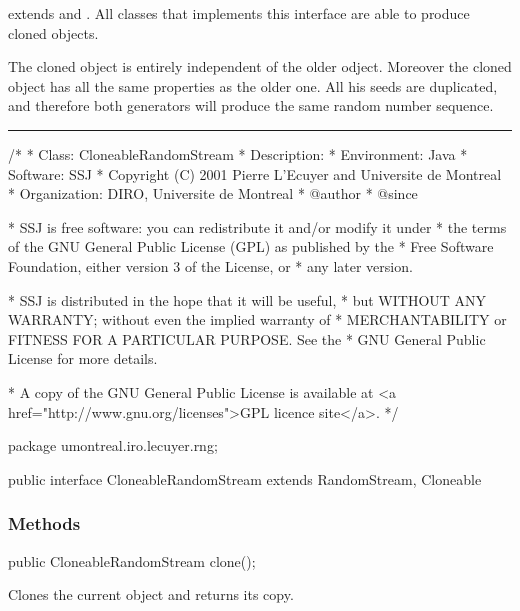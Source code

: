 
 extends  and . 
All classes that implements this interface are able to produce cloned objects.

The cloned object is entirely independent of the older odject.
Moreover the cloned object has all the same properties as the older one. 
All his seeds are duplicated, and therefore both generators will produce the
same random number sequence.

\bigskip\hrule

\begin{code}
\begin{hide}
/*
 * Class:        CloneableRandomStream
 * Description:  
 * Environment:  Java
 * Software:     SSJ 
 * Copyright (C) 2001  Pierre L'Ecuyer and Universite de Montreal
 * Organization: DIRO, Universite de Montreal
 * @author       
 * @since

 * SSJ is free software: you can redistribute it and/or modify it under
 * the terms of the GNU General Public License (GPL) as published by the
 * Free Software Foundation, either version 3 of the License, or
 * any later version.

 * SSJ is distributed in the hope that it will be useful,
 * but WITHOUT ANY WARRANTY; without even the implied warranty of
 * MERCHANTABILITY or FITNESS FOR A PARTICULAR PURPOSE.  See the
 * GNU General Public License for more details.

 * A copy of the GNU General Public License is available at
   <a href="http://www.gnu.org/licenses">GPL licence site</a>.
 */
\end{hide}
package umontreal.iro.lecuyer.rng;

public interface CloneableRandomStream extends RandomStream, Cloneable \begin{hide} { \end{hide}
\end{code}

\subsubsection* {Methods}
\begin{code}

   public CloneableRandomStream clone();
\end{code}
 \begin{tabb} Clones the current object and returns its copy.
 \end{tabb}
 \begin{htmlonly}
\end{htmlonly}

\begin{code}\begin{hide} 
}
\end{hide}
\end{code}
